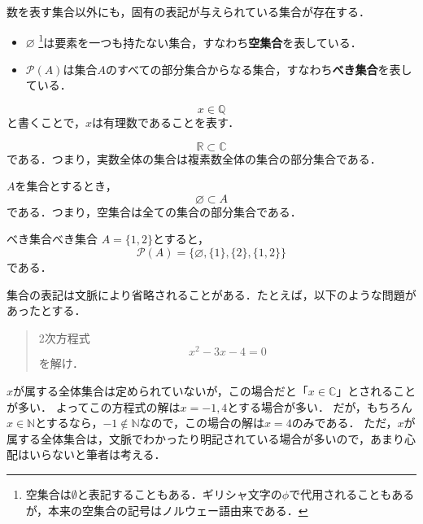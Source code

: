 \documentclass[a4paper,11pt]{ltjsarticle}
\renewcommand{\emph}[1]{\textbf{#1}}
\begin{document}
\begin{shadebox}
  数を表す集合以外にも，固有の表記が与えられている集合が存在する．
  \begin{itemize}
    \item $\varnothing$ \footnote{空集合は$\emptyset$と表記することもある．ギリシャ文字の$\phi$で代用されることもあるが，本来の空集合の記号はノルウェー語由来である．}は要素を一つも持たない集合，すなわち\emph{空集合}を表している．
    \item $\mathcal{P}(A)$は集合$A$のすべての部分集合からなる集合，すなわち\emph{べき集合}を表している．
  \end{itemize}
\end{shadebox}



\begin{example}{}{}
  \[
    x \in \mathbb{Q}
  \]
  と書くことで，$x$は有理数であることを表す．
\end{example}

\begin{example}{}{}
  \[
    \mathbb{R} \subset \mathbb{C}
  \]
  である．つまり，実数全体の集合は複素数全体の集合の部分集合である．
\end{example}

\begin{example}{}{}
  $A$を集合とするとき，
  \[
    \varnothing  \subset A
  \]
  である．つまり，空集合は全ての集合の部分集合である．
\end{example}

\begin{example}{べき集合}{べき集合}
  $A=\{ 1, 2\}$とすると，
  \[
    \mathcal{P}(A) = \{ \varnothing, \{1\}, \{2\}, \{1, 2\}\}
  \]
  である．
\end{example}



集合の表記は文脈により省略されることがある．たとえば，以下のような問題があったとする．
\begin{quotation}
  2次方程式
  \[
    x^2 - 3x -4 =0
  \]
  を解け．
\end{quotation}
$x$が属する全体集合は定められていないが，この場合だと「$x \in \mathbb{C}$」とされることが多い．
よってこの方程式の解は$x = -1 , 4$とする場合が多い．
だが，もちろん$ x \in \mathbb{N}$とするなら，$ -1 \notin \mathbb{N}$なので，この場合の解は$ x= 4$のみである．
ただ，$x$が属する全体集合は，文脈でわかったり明記されている場合が多いので，あまり心配はいらないと筆者は考える．
\end{document}

